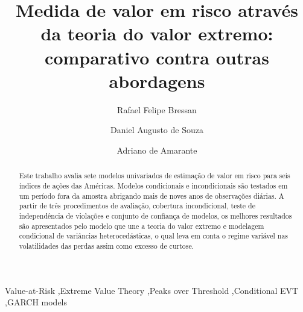\documentclass[1p]{elsarticle}
\theoremstyle{definition}
\begin{document}
	
\listoftodos

\begin{frontmatter}

\title{Medida de valor em risco através da teoria do valor extremo:\\comparativo contra outras abordagens}




\author[mymainaddress]{Rafael Felipe Bressan}
%
\author[mymainaddress]{Daniel Augusto de Souza}
\author[mymainaddress]{Adriano de Amarante}

\address[mymainaddress]{Avenida Madre Benvenuta, 2007 - Santa Mônica Florianópolis - SC 88035-901}

\begin{abstract}
	Este trabalho avalia sete modelos univariados de estimação de valor em risco para seis índices de ações das Américas. Modelos condicionais e incondicionais são testados em um período fora da amostra abrigando mais de noves anos de observações diárias. A partir de três procedimentos de avaliação, cobertura incondicional, teste de independência de violações e conjunto de confiança de modelos, os melhores resultados são apresentados pelo modelo que une a teoria do valor extremo e modelagem condicional de variâncias heterocedásticas, o qual leva em conta o regime variável nas volatilidades das perdas assim como excesso de curtose.
\end{abstract}

\begin{keyword}
Value-at-Risk \sep Extreme Value Theory \sep Peaks over Threshold \sep Conditional EVT \sep GARCH models
\end{keyword}

\end{frontmatter}
\end{document}
